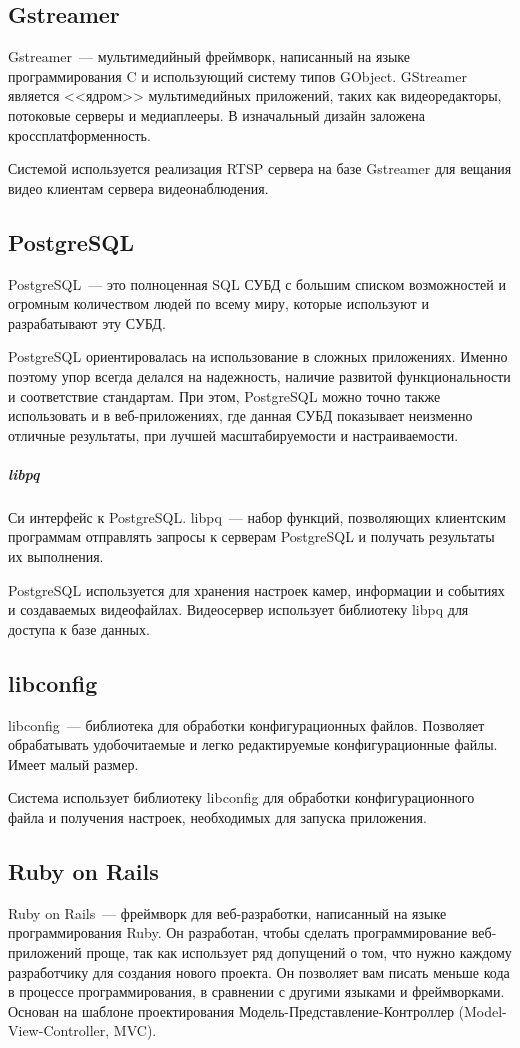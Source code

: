 \subsection{Gstreamer}
Gstreamer~--- мультимедийный фреймворк, написанный на языке программирования C и
использующий систему типов GObject. GStreamer является <<ядром>> мультимедийных приложений,
таких как видеоредакторы, потоковые серверы и медиаплееры. В изначальный дизайн заложена
кроссплатформенность.

Системой используется реализация RTSP сервера на базе Gstreamer для вещания видео клиентам сервера
видеонаблюдения.

\subsection{PostgreSQL}
PostgreSQL~--- это полноценная SQL СУБД с большим списком возможностей и огромным количеством
людей по всему миру, которые используют и разрабатывают эту СУБД.

PostgreSQL ориентировалась на использование в сложных приложениях. Именно поэтому упор всегда делался
на надежность, наличие развитой функциональности и соответствие стандартам. При этом, PostgreSQL
можно точно также использовать и в веб-приложениях, где данная СУБД показывает неизменно отличные
результаты, при лучшей масштабируемости и настраиваемости.

\subparagraph{libpq}
Си интерфейс к PostgreSQL. libpq~--- набор функций, позволяющих клиентским программам
отправлять запросы к серверам PostgreSQL и получать результаты их выполнения.

PostgreSQL используется для хранения настроек камер, информации и событиях и создаваемых видеофайлах.
Видеосервер использует библиотеку libpq для доступа к базе данных.

\subsection{libconfig}
libconfig~--- библиотека для обработки конфигурационных файлов.
Позволяет обрабатывать удобочитаемые и легко редактируемые конфигурационные файлы.
Имеет малый размер.

Система использует библиотеку libconfig для обработки конфигурационного файла и получения настроек,
необходимых для запуска приложения.

\subsection{Ruby on Rails}
Ruby on Rails~--- фреймворк для веб-разработки, написанный на языке программирования Ruby.
Он разработан, чтобы сделать программирование веб-приложений проще, так как использует ряд допущений
о том, что нужно каждому разработчику для создания нового проекта. Он позволяет вам писать меньше
кода в процессе программирования, в сравнении с другими языками и фреймворками. Основан на
шаблоне проектирования Модель-Представление-Контроллер (Model-View-Controller, MVC).

